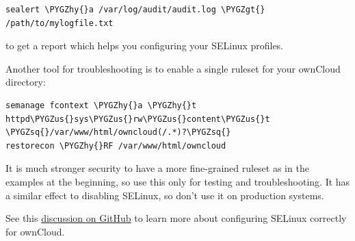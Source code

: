 \documentclass[letterpaper,10pt,english]{sphinxmanual}
\def\PYGZus{\char`\_}
\def\PYGZgt{\char`\>}
\def\PYGZhy{\char`\-}
\def\PYGZsq{\char`\'}
\renewcommand\PYGZsq{\textquotesingle}
\begin{document}
\begin{Verbatim}[commandchars=\\\{\}]
sealert \PYGZhy{}a /var/log/audit/audit.log \PYGZgt{} /path/to/mylogfile.txt
\end{Verbatim}

to get a report which helps you configuring your SELinux profiles.

Another tool for troubleshooting is to enable a single ruleset for your ownCloud directory:

\begin{Verbatim}[commandchars=\\\{\}]
semanage fcontext \PYGZhy{}a \PYGZhy{}t httpd\PYGZus{}sys\PYGZus{}rw\PYGZus{}content\PYGZus{}t \PYGZsq{}/var/www/html/owncloud(/.*)?\PYGZsq{}
restorecon \PYGZhy{}RF /var/www/html/owncloud
\end{Verbatim}

It is much stronger security to have a more fine-grained ruleset as in the examples at the beginning, so use this only for testing and troubleshooting. It has a similar effect to disabling SELinux, so don't use it on production systems.

See this \href{https://github.com/owncloud/documentation/pull/2693}{discussion on GitHub} to learn more about configuring SELinux correctly for ownCloud.
\end{document}
